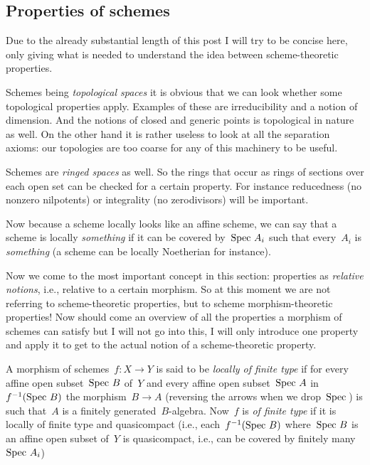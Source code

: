 \subsection{Properties of schemes}
Due to the already substantial length of this post I will try to be concise here, only giving what is needed to understand the idea between scheme-theoretic properties.

\begin{example}
  Schemes being \emph{topological spaces} it is obvious that we can look whether some topological properties apply. Examples of these are irreducibility and a notion of dimension. And the notions of closed and generic points is topological in nature as well. On the other hand it is rather useless to look at all the separation axioms: our topologies are too coarse for any of this machinery to be useful.
\end{example}

\begin{example}
  Schemes are \emph{ringed spaces} as well. So the rings that occur as rings of sections over each open set can be checked for a certain property. For instance reducedness (no nonzero nilpotents) or integrality (no zerodivisors) will be important.
\end{example}

\begin{example}
  Now because a scheme locally looks like an affine scheme, we can say that a scheme is locally \emph{something} if it can be covered by~$\operatorname{Spec\,} A_i$ such that every~$A_i$ is \emph{something} (a scheme can be locally Noetherian for instance).
\end{example}

\begin{example}
   Now we come to the most important concept in this section: properties as \emph{relative notions}, i.e., relative to a certain morphism. So at this moment we are not referring to scheme-theoretic properties, but to scheme morphism-theoretic properties! Now should come an overview of all the properties a morphism of schemes can satisfy but I will not go into this, I will only introduce one property and apply it to get to the actual notion of a scheme-theoretic property. 
\end{example}

\begin{definition}
  A morphism of schemes~$f\colon X\to Y$ is said to be \emph{locally of finite type} if for every affine open subset~$\operatorname{Spec\,} B$ of~$Y$ and every affine open subset~$\operatorname{Spec\,} A$ in~$f^{-1}(\operatorname{Spec\,} B)$ the morphism~$B\to A$ (reversing the arrows when we drop~$\operatorname{Spec\,}$) is such that~$A$ is a finitely generated~$B$-algebra. Now~$f$ is \emph{of finite type} if it is locally of finite type and quasicompact (i.e., each~$f^{-1}(\operatorname{Spec\,} B)$ where~$\operatorname{Spec\,} B$ is an affine open subset of~$Y$ is quasicompact, i.e., can be covered by finitely many~$\operatorname{Spec\,} A_i$)
\end{definition}

